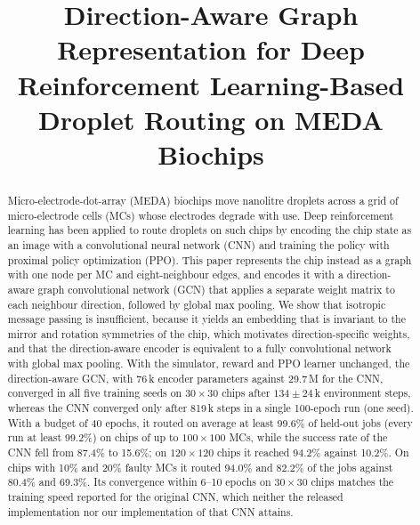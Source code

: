 \documentclass[conference,onecolumn,11pt]{IEEEtran}
\begin{document}
\title{Direction-Aware Graph Representation for Deep Reinforcement Learning-Based Droplet Routing on MEDA Biochips}

\author{
}

\maketitle

\begin{abstract}
Micro-electrode-dot-array (MEDA) biochips move nanolitre droplets across a grid of
micro-electrode cells (MCs) whose electrodes degrade with use. Deep reinforcement learning
has been applied to route droplets on such chips by encoding the chip state as an image
with a convolutional neural network (CNN) and training the policy with proximal policy
optimization (PPO). This paper represents the chip instead as a graph with one node per MC
and eight-neighbour edges, and encodes it with a direction-aware graph convolutional network
(GCN) that applies a separate weight matrix to each neighbour direction, followed by global
max pooling. We show that isotropic message passing is insufficient, because it yields an
embedding that is invariant to the mirror and rotation symmetries of the chip, which
motivates direction-specific weights, and that the direction-aware encoder is equivalent to a fully
convolutional network with global max pooling. With the simulator, reward and PPO learner
unchanged, the direction-aware GCN, with 76\,k encoder parameters against 29.7\,M for the
CNN, converged in all five training seeds on $30\times30$ chips after
$134\pm24$\,k environment steps, whereas the CNN converged only after 819\,k steps in a
single 100-epoch run (one seed). With a budget of 40 epochs, it routed on average at least
99.6\% of held-out jobs (every run at least 99.2\%) on chips of up to $100\times100$ MCs, while the success rate of the CNN fell from 87.4\% to
15.6\%; on $120\times120$ chips it reached 94.2\% against 10.2\%. On chips with 10\% and
20\% faulty MCs it routed 94.0\% and 82.2\% of the jobs against 80.4\% and 69.3\%. Its convergence within 6--10 epochs on $30\times30$ chips matches the
training speed reported for the original CNN, which neither the released implementation
nor our implementation of that CNN attains.
\end{abstract}
\end{document}
